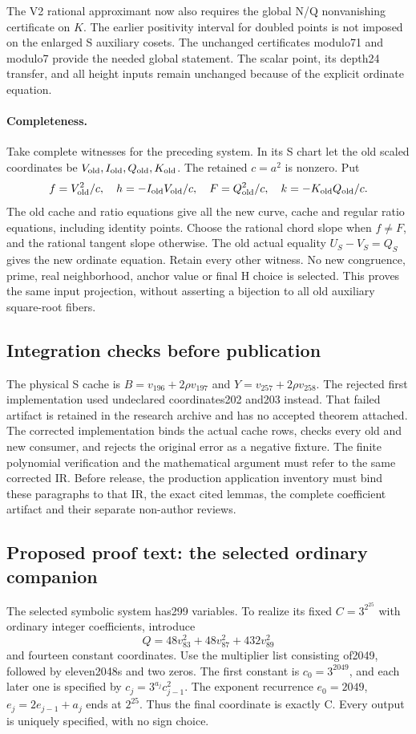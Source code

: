 The V2 rational approximant now also requires the global N/Q
nonvanishing certificate on $K$. The earlier positivity interval for
doubled points is not imposed on the enlarged S auxiliary cosets.
The unchanged certificates modulo71 and modulo7 provide the needed
global statement. The scalar point, its depth24 transfer, and all
height inputs remain unchanged because of the explicit ordinate equation.

\paragraph{Completeness.}
Take complete witnesses for the preceding system. In its S chart let
the old scaled coordinates be $V_{\rm old},I_{\rm old},Q_{\rm old},
K_{\rm old}$. The retained $c=a^2$ is nonzero. Put
\[
 f=V_{\rm old}^2/c,\quad h=-I_{\rm old}V_{\rm old}/c,\quad
 F=Q_{\rm old}^2/c,\quad k=-K_{\rm old}Q_{\rm old}/c.
\]
The old cache and ratio equations give all the new curve, cache and
regular ratio equations, including identity points. Choose the rational
chord slope when $f\ne F$, and the rational tangent slope otherwise.
The old actual equality $U_S-V_S=Q_S$ gives the new ordinate equation.
Retain every other witness. No new congruence, prime, real neighborhood,
anchor value or final H choice is selected. This proves the same input
projection, without asserting a bijection to all old auxiliary
square-root fibers.

\subsection{Integration checks before publication}
\label{outline:r6-expanded-binding}
The physical S cache is $B=v_{196}+2\rho v_{197}$ and
$Y=v_{257}+2\rho v_{258}$. The rejected first implementation used
undeclared coordinates202 and203 instead. That failed artifact is
retained in the research archive and has no accepted theorem attached.
The corrected implementation binds the actual cache rows, checks every
old and new consumer, and rejects the original error as a negative
fixture. The finite polynomial verification and the mathematical
argument must refer to the same corrected IR. Before release, the
production application inventory must bind these paragraphs to that IR,
the exact cited lemmas, the complete coefficient artifact and their
separate non-author reviews.

\subsection{Proposed proof text: the selected ordinary companion}
\label{outline:r6-expanded-ordinary314}
The selected symbolic system has299 variables. To realize its fixed
$C=3^{2^{25}}$ with ordinary integer coefficients, introduce
\[
 Q=48v_{83}^2+48v_{87}^2+432v_{89}^2
\]
and fourteen constant coordinates. Use the multiplier list consisting
of2049, followed by eleven2048s and two zeros. The first constant is
$c_0=3^{2049}$, and each later one is specified by
$c_j=3^{a_j}c_{j-1}^2$. The exponent recurrence
$e_0=2049$, $e_j=2e_{j-1}+a_j$ ends at $2^{25}$.
Thus the final coordinate is exactly C. Every output is uniquely
specified, with no sign choice.

